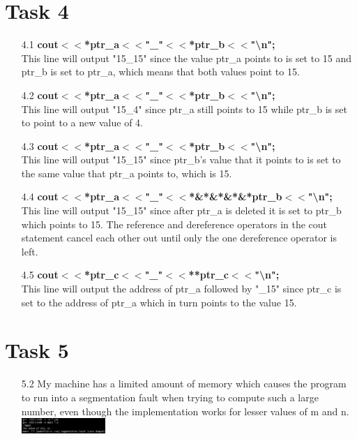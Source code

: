 \documentclass{article}
\begin{document}
\section*{Task 4}
\begin{itemize}
    \item[4.1] \textbf{cout$<<$*ptr\_a$<<$"\_"$<<$*ptr\_b$<<$"\textbackslash n";} \\
                This line will output "15\_15" since the value ptr\_a points to is set to
                15 and ptr\_b is set to ptr\_a, which means that both values point to 15.
    \item[4.2] \textbf{cout$<<$*ptr\_a$<<$"\_"$<<$*ptr\_b$<<$"\textbackslash n";} \\
                This line will output "15\_4" since ptr\_a still points to 15 while 
                ptr\_b is set to point to a new value of 4.
    \item[4.3] \textbf{cout$<<$*ptr\_a$<<$"\_"$<<$*ptr\_b$<<$"\textbackslash n";} \\
                This line will output "15\_15" since ptr\_b's value that it points to
                is set to the same value that ptr\_a points to, which is 15.
    \item[4.4] \textbf{cout$<<$*ptr\_a$<<$"\_"$<<$*\&*\&*\&*\&*ptr\_b$<<$"\textbackslash n";} \\
                This line will output "15\_15" since after ptr\_a is deleted it is set 
                to ptr\_b which points to 15. The reference and dereference operators in 
                the cout statement cancel each other out until only the one dereference 
                operator is left.
    \item[4.5] \textbf{cout$<<$*ptr\_c$<<$"\_"$<<$**ptr\_c$<<$"\textbackslash n";} \\
                This line will output the address of ptr\_a followed by "\_15" since
                ptr\_c is set to the address of ptr\_a which in turn points to the value 15.
\end{itemize}
\section*{Task 5}
\begin{itemize}
    \item[5.2] My machine has a limited amount of memory which causes the program to run into 
    a segmentation fault when trying to compute such a large number, even though the implementation
     works for lesser values of m and n.\\
    \includegraphics[width=0.25\textwidth]{../img/Task5_2.png}
\end{itemize}
\end{document}
